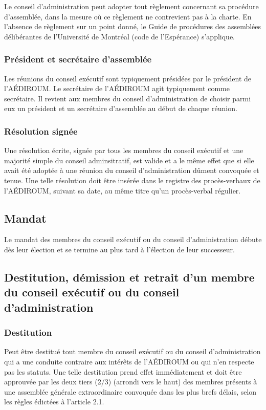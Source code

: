 \documentclass[12pt]{article}
\begin{document}
Le conseil d'administration peut adopter tout règlement concernant sa procédure d'assemblée, dans la mesure où ce règlement ne contrevient pas à la charte. En l'absence de règlement sur un point donné, le Guide de procédures des assemblées délibérantes de l'Université de Montréal (code de l'Espérance) s'applique.

\subsubsection{Président et secrétaire d'assemblée}

Les réunions du conseil exécutif sont typiquement présidées par le président de l'AÉDIROUM. Le secrétaire de l'AÉDIROUM agit typiquement comme secrétaire. Il revient aux membres du conseil d'administration de choisir parmi eux un président et un secrétaire d'assemblée au début de chaque réunion.

\subsubsection{Résolution signée}

Une résolution écrite, signée par tous les membres du conseil exécutif et une majorité simple du conseil adminsitratif, est valide et a le même effet que si elle avait été adoptée à une réunion du conseil d'administration dûment convoquée et tenue. Une telle résolution doit être insérée dans le registre des procès-verbaux de l'AÉDIROUM, suivant sa date, au même titre qu'un procès-verbal régulier.

\subsection{Mandat}
Le mandat des membres du conseil exécutif ou du conseil d'administration débute dès leur élection et se termine au plus tard à l'élection de leur successeur.

\subsection{Destitution, démission et retrait d'un membre du conseil exécutif ou du conseil d'administration}
\subsubsection{Destitution}

Peut être destitué tout membre du conseil exécutif ou du conseil d'administration qui a une conduite contraire aux intérêts de l'AÉDIROUM ou qui n'en respecte pas les statuts. Une telle destitution prend effet immédiatement et doit être approuvée par les deux tiers (2/3) (arrondi vers le haut) des membres présents à une assemblée générale extraordinaire convoquée dans les plus brefs délais, selon les règles édictées à l'article 2.1.
\end{document}
